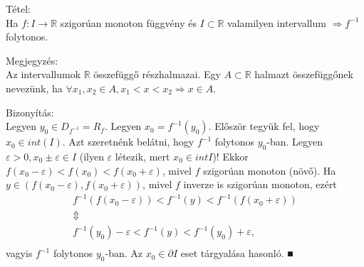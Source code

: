 \documentclass[12pt,a4paper]{scrartcl}
\newenvironment{tetel}{}{}
\newenvironment{bizonyitas}{}{}
\newenvironment{megjegyzes}{}{}
\begin{document}
\begin{tetel}

Tétel:\\
Ha \(\left. f:I\rightarrow{\mathbb{R}} \right.\) szigorúan monoton
függvény és \(I \subset {\mathbb{R}}\) valamilyen intervallum
\(\left. \Rightarrow f^{- 1} \right.\) folytonos.

\end{tetel}

\begin{megjegyzes}

Megjegyzés:\\
Az intervallumok \(\mathbb{R}\) összefüggő részhalmazai. Egy
\(A \subset {\mathbb{R}}\) halmazt összefüggőnek nevezünk, ha
\(\left. \forall x_{1},x_{2} \in A,x_{1} < x < x_{2}\Rightarrow x \in A \right.\).

\end{megjegyzes}

\begin{bizonyitas}

Bizonyítás:\\
Legyen \(y_{0} \in D_{f^{- 1}} = R_{f}\). Legyen
\(x_{0} = f^{- 1}\left( y_{0} \right)\). Először tegyük fel, hogy
\(x_{0} \in {int}\left( I \right)\). Azt szeretnénk belátni, hogy
\(f^{- 1}\) folytonos \(y_{0}\)-ban. Legyen
\(\varepsilon > 0,x_{0} \pm \varepsilon \in I\) (ilyen \(\varepsilon\)
létezik, mert \(x_{0} \in {int}I\))! Ekkor
\(f\left( {x_{0} - \varepsilon} \right) < f\left( x_{0} \right) < f\left( {x_{0} + \varepsilon} \right)\),
mivel \(f\) szigorúan monoton (növő). Ha
\(y \in \left( {f\left( {x_{0} - \varepsilon} \right),f\left( {x_{0} + \varepsilon} \right)} \right)\),
mivel \(f\) inverze is szigorúan monoton, ezért \[\begin{matrix}
{f^{- 1}\left( {f\left( {x_{0} - \varepsilon} \right)} \right) < f^{- 1}\left( y \right) < f^{- 1}\left( {f\left( {x_{0} + \varepsilon} \right)} \right)} \\
 \Updownarrow \\
{f^{- 1}\left( y_{0} \right) - \varepsilon < f^{- 1}\left( y \right) < f^{- 1}\left( y_{0} \right) + \varepsilon,} \\
\end{matrix}\] vagyis \(f^{- 1}\) folytonos \(y_{0}\)-ban. Az
\(x_{0} \in \partial I\) eset tárgyalása hasonló. ■

\end{bizonyitas}
\end{document}
